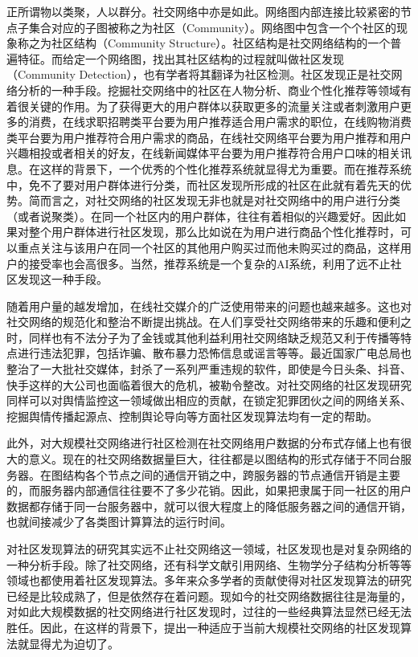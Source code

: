 正所谓物以类聚，人以群分。社交网络中亦是如此。网络图内部连接比较紧密的节点子集合对应的子图被称之为社区（Community）。网络图中包含一个个社区的现象称之为社区结构（Community Structure）。社区结构是社交网络结构的一个普遍特征。而给定一个网络图，找出其社区结构的过程就叫做社区发现（Community Detection），也有学者将其翻译为社区检测。社区发现正是社交网络分析的一种手段。挖掘社交网络中的社区在人物分析、商业个性化推荐等领域有着很关键的作用。为了获得更大的用户群体以获取更多的流量关注或者刺激用户更多的消费，在线求职招聘类平台要为用户推荐适合用户需求的职位，在线购物消费类平台要为用户推荐符合用户需求的商品，在线社交网络平台要为用户推荐和用户兴趣相投或者相关的好友，在线新闻媒体平台要为用户推荐符合用户口味的相关讯息。在这样的背景下，一个优秀的个性化推荐系统就显得尤为重要。而在推荐系统中，免不了要对用户群体进行分类，而社区发现所形成的社区在此就有着先天的优势。简而言之，对社交网络的社区发现无非也就是对社交网络中的用户进行分类（或者说聚类）。在同一个社区内的用户群体，往往有着相似的兴趣爱好。因此如果对整个用户群体进行社区发现，那么比如说在为用户进行商品个性化推荐时，可以重点关注与该用户在同一个社区的其他用户购买过而他未购买过的商品，这样用户的接受率也会高很多。当然，推荐系统是一个复杂的AI系统，利用了远不止社区发现这一种手段。

随着用户量的越发增加，在线社交媒介的广泛使用带来的问题也越来越多。这也对社交网络的规范化和整治不断提出挑战。在人们享受社交网络带来的乐趣和便利之时，同样也有不法分子为了金钱或其他利益利用社交网络缺乏规范又利于传播等特点进行违法犯罪，包括诈骗、散布暴力恐怖信息或谣言等等。最近国家广电总局也整治了一大批社交媒体，封杀了一系列严重违规的软件，即使是今日头条、抖音、快手这样的大公司也面临着很大的危机，被勒令整改。对社交网络的社区发现研究同样可以对舆情监控这一领域做出相应的贡献，在锁定犯罪团伙之间的网络关系、挖掘舆情传播起源点、控制舆论导向等方面社区发现算法均有一定的帮助。

此外，对大规模社交网络进行社区检测在社交网络用户数据的分布式存储上也有很大的意义。现在的社交网络数据量巨大，往往都是以图结构的形式存储于不同台服务器。在图结构各个节点之间的通信开销之中，跨服务器的节点通信开销是主要的，而服务器内部通信往往要不了多少花销。因此，如果把隶属于同一社区的用户数据都存储于同一台服务器中，就可以很大程度上的降低服务器之间的通信开销，也就间接减少了各类图计算算法的运行时间。

对社区发现算法的研究其实远不止社交网络这一领域，社区发现也是对复杂网络的一种分析手段。除了社交网络，还有科学文献引用网络、生物学分子结构分析等等领域也都使用着社区发现算法。多年来众多学者的贡献使得对社区发现算法的研究已经是比较成熟了，但是依然存在着问题。现如今的社交网络数据往往是海量的，对如此大规模数据的社交网络进行社区发现时，过往的一些经典算法显然已经无法胜任。因此，在这样的背景下，提出一种适应于当前大规模社交网络的社区发现算法就显得尤为迫切了。

